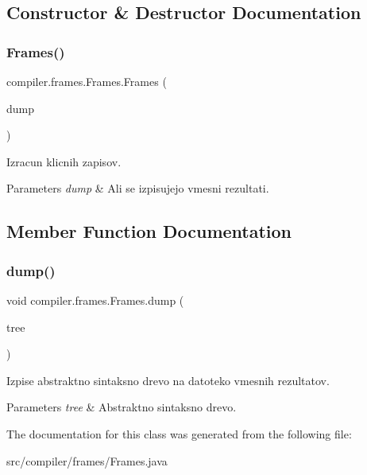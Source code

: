 \subsection{Constructor \& Destructor Documentation}
\mbox{\label{classcompiler_1_1frames_1_1_frames_aab522ed0fbfb09ef6161dcdbe4ec304b}} 
\subsubsection{\texorpdfstring{Frames()}{Frames()}}
{\footnotesize\ttfamily compiler.\+frames.\+Frames.\+Frames (\begin{DoxyParamCaption}\item[{boolean}]{dump }\end{DoxyParamCaption})}

Izracun klicnih zapisov.


\begin{DoxyParams}{Parameters}
{\em dump} & Ali se izpisujejo vmesni rezultati. \\
\hline
\end{DoxyParams}


\subsection{Member Function Documentation}
\mbox{\label{classcompiler_1_1frames_1_1_frames_ac8372ea4f316b251fbeceac588176429}} 
\subsubsection{\texorpdfstring{dump()}{dump()}}
{\footnotesize\ttfamily void compiler.\+frames.\+Frames.\+dump (\begin{DoxyParamCaption}\item[{\hyperlink{classcompiler_1_1abstr_1_1tree_1_1_abs_tree}{Abs\+Tree}}]{tree }\end{DoxyParamCaption})}

Izpise abstraktno sintaksno drevo na datoteko vmesnih rezultatov.


\begin{DoxyParams}{Parameters}
{\em tree} & Abstraktno sintaksno drevo. \\
\hline
\end{DoxyParams}


The documentation for this class was generated from the following file\+:\begin{DoxyCompactItemize}
\item 
src/compiler/frames/Frames.\+java\end{DoxyCompactItemize}
